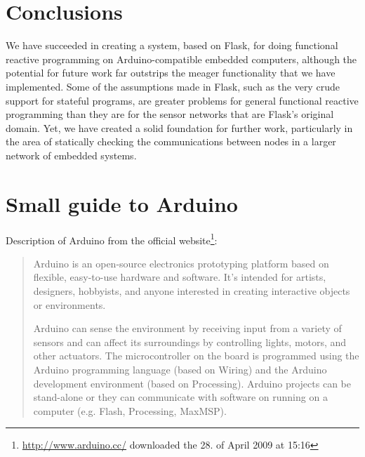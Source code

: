 \documentclass[a4paper, oneside, final]{memoir}
\begin{document}
\chapter{Conclusions}


We have succeeded in creating a system, based on Flask, for doing
functional reactive programming on Arduino-compatible embedded
computers, although the potential for future work far outstrips the
meager functionality that we have implemented.  Some of the
assumptions made in Flask, such as the very crude support for stateful
programs, are greater problems for general functional reactive
programming than they are for the sensor networks that are Flask's
original domain.  Yet, we have created a solid foundation for further
work, particularly in the area of statically checking the
communications between nodes in a larger network of embedded systems.




\appendix

\chapter{Small guide to Arduino}

Description of Arduino from the official
website\footnote{\url{http://www.arduino.cc/} downloaded the 28. of April 2009 at 15:16}:
\begin{quotation}
  Arduino is an open-source electronics prototyping platform based on
  flexible, easy-to-use hardware and software. It's intended for
  artists, designers, hobbyists, and anyone interested in creating
  interactive objects or environments.

  Arduino can sense the environment by receiving input from a variety
  of sensors and can affect its surroundings by controlling lights,
  motors, and other actuators. The microcontroller on the board is
  programmed using the Arduino programming language (based on Wiring)
  and the Arduino development environment (based on
  Processing). Arduino projects can be stand-alone or they can
  communicate with software on running on a computer (e.g. Flash,
  Processing, MaxMSP).
\end{quotation}
\end{document}
